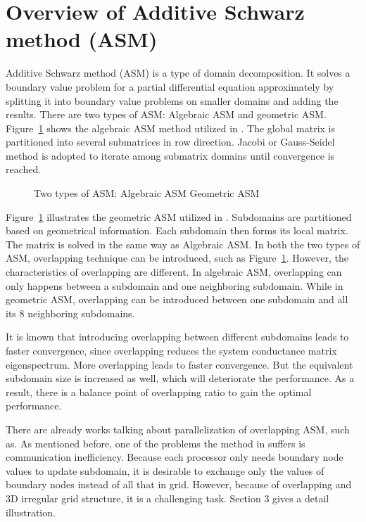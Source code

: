 \documentclass{sig-alternate}
\begin{document}
\section{Overview of Additive Schwarz method (ASM)}	
	Additive Schwarz method (ASM) is a type of domain decomposition. It solves a boundary value problem for a partial 
	differential equation approximately by splitting it into boundary value problems on smaller domains and adding the results.
	There are two types of ASM: Algebraic ASM and geometric ASM. 
	Figure~\ref{Fig2} shows the algebraic ASM method utilized in \cite{kaisun}. The global matrix
	is partitioned into several submatrices in row direction. Jacobi or Gauss-Seidel method is adopted to iterate among 
	submatrix domains until convergence is reached.
	\begin{figure}[htbp]
	  \caption{Two types of ASM: 
	   Algebraic ASM
	   Geometric ASM}
	  \label{Fig2}
	\end{figure}
	Figure~\ref{Fig2} illustrates the geometric ASM utilized in \cite{Zhongyu}. Subdomains are partitioned based on
	geometrical information. Each subdomain then forms its local matrix. The matrix is
	solved in the same way as Algebraic ASM. In both the two types of ASM, overlapping technique can be introduced, such as 
	Figure~\ref{Fig2}. However, the characteristics of overlapping are different.
	In algebraic ASM, overlapping can only happens between a subdomain and one neighboring subdomain. While in 
	geometric ASM, overlapping can be introduced between one subdomain and all its 8 neighboring subdomains.
	
	It is known that introducing overlapping between different subdomains leads to faster convergence, 
	since overlapping reduces the system conductance matrix eigenspectrum\cite{Klawonn, Taopeng}. More overlapping leads to faster 
	convergence.
	But the equivalent subdomain size is increased as well, which will deteriorate the performance. As a result, there is a 
	balance point of overlapping ratio to gain the optimal performance.

	There are already works talking about parallelization of overlapping ASM, such as\cite{kaisun}. As mentioned before, one of the
	problems the method in \cite{kaisun} suffers is communication inefficiency. Because each processor only needs boundary node 
	values to update subdomain, it is desirable to exchange only the values of boundary nodes instead of all that in grid. 
	However, because of overlapping and 3D irregular grid structure, it is a 
	challenging task. Section 3 gives a detail illustration.
 
\end{document}
